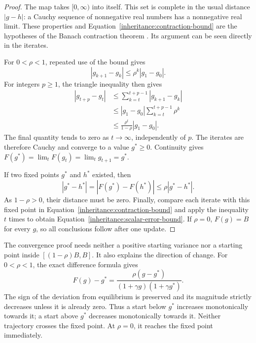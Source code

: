 \begin{proof}
  The map takes $[0,\infty)$ into itself. This set is complete in
  the usual distance $|g-h|$: a Cauchy sequence of nonnegative real
  numbers has a nonnegative real limit. These properties and
  Equation~\eqref{inheritance:contraction-bound} are the hypotheses
  of the Banach contraction theorem \citep{Banach1922,GranasDugundji2003}.
  Its argument can be seen directly in the iterates.

  For $0<\rho<1$, repeated use of the bound gives
  \begin{equation}
    |g_{k+1}-g_k|\leq\rho^k|g_1-g_0|.
  \end{equation}
  For integers $p\geq1$, the triangle inequality then gives
  \begin{align}
    |g_{t+p}-g_t|
       &\leq\sum_{k=t}^{t+p-1}|g_{k+1}-g_k|\\
       &\leq|g_1-g_0|\sum_{k=t}^{t+p-1}\rho^k\\
       &\leq\frac{\rho^t}{1-\rho}|g_1-g_0|.
  \end{align}
  The final quantity tends to zero as $t\to\infty$, independently
  of $p$. The iterates are therefore Cauchy and converge to a value
  $g^*\geq0$. Continuity gives
  $F(g^*)=\lim_tF(g_t)=\lim_tg_{t+1}=g^*$.

  If two fixed points $g^*$ and $h^*$ existed, then
  \begin{equation}
    |g^*-h^*|=|F(g^*)-F(h^*)|\leq\rho|g^*-h^*|.
  \end{equation}
  As $1-\rho>0$, their distance must be zero. Finally, compare each
  iterate with this fixed point in
  Equation~\eqref{inheritance:contraction-bound} and apply the
  inequality $t$ times to obtain
  Equation~\eqref{inheritance:scalar-error-bound}. If $\rho=0$,
  $F(g)=B$ for every $g$, so all conclusions follow after one update.
\end{proof}

The convergence proof needs neither a positive starting variance nor
a starting point inside $[(1-\rho)B,B]$. It also explains the direction
of change. For $0<\rho<1$, the exact difference formula gives
\begin{equation}
  F(g)-g^*
     =\frac{\rho(g-g^*)}{(1+\gamma g)(1+\gamma g^*)}.
  \label{inheritance:no-overshoot}
\end{equation}
The sign of the deviation from equilibrium is preserved and its magnitude
strictly decreases unless it is already zero. Thus a start below $g^*$
increases monotonically towards it; a start above $g^*$ decreases
monotonically towards it. Neither trajectory crosses the fixed point.
At $\rho=0$, it reaches the fixed point immediately.

